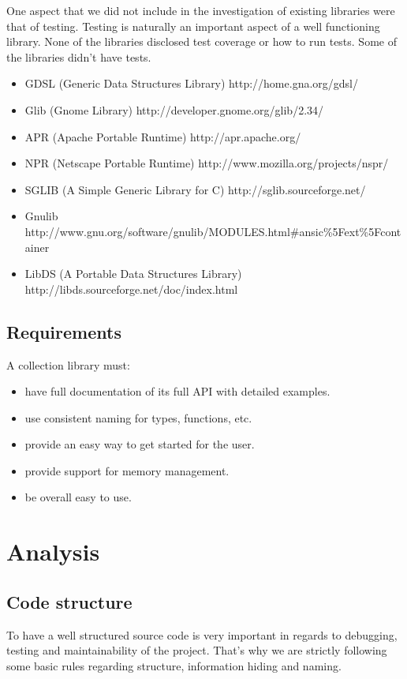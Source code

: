 \documentclass[11pt, letterpaper, twoside, openright]{book}
\begin{document}
    One aspect that we did not include in the investigation of existing libraries were that of testing. Testing is naturally an important aspect of a well functioning library. None of the libraries disclosed test coverage or how to run tests. Some of the libraries didn't have tests.\\

    \begin{itemize}
      \item GDSL (Generic Data Structures Library) http://home.gna.org/gdsl/
      \item Glib (Gnome Library) http://developer.gnome.org/glib/2.34/
      \item  APR (Apache Portable Runtime) http://apr.apache.org/
      \item NPR (Netscape Portable Runtime) http://www.mozilla.org/projects/nspr/
      \item SGLIB (A Simple Generic Library for C) http://sglib.sourceforge.net/
      \item Gnulib http://www.gnu.org/software/gnulib/MODULES.html\#ansic\%5Fext\%5Fcontainer
      \item LibDS (A Portable Data Structures Library) http://libds.sourceforge.net/doc/index.html
    \end{itemize}

  \subsection{Requirements}\label{sec:requirements}

    A collection library must:
    
    \begin{itemize}
      \item have full documentation of its full API with detailed examples.
      \item use consistent naming for types, functions, etc.
      \item provide an easy way to get started for the user.
      \item provide support for memory management.
      \item be overall easy to use.
    \end{itemize}


\section{Analysis}\label{sec:analysis}

  \subsection{Code structure}
    To have a well structured source code is very important in regards to debugging, testing and maintainability of the project. That's why we are strictly following some basic rules regarding structure, information hiding and naming.\\
\end{document}

